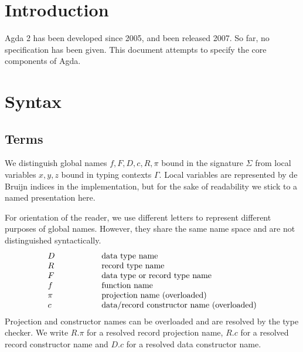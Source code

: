 \documentclass[acmlarge,fleqn]{acmart}\settopmatter{}
\renewcommand{\|}{\mid}
\begin{document}
\section{Introduction}

Agda 2 has been developed since 2005, and been released 2007.  So far,
no specification has been given.  This document attempts to specify
the core components of Agda.


\section{Syntax}
\label{sec:syntax}

\newcommand{\bang}{\,!\,}
\newcommand{\twobang}{\,!!\,}
\newcommand{\dotp}[1]{\lfloor#1\rfloor}

\subsection{Terms}

We distinguish global names $f,F,D,c,R,\pi$ bound in the signature $\Sigma$ from
local variables $x,y,z$ bound in typing contexts $\Gamma$.  Local
variables are represented by de Bruijn indices in the implementation,
but for the sake of readability we stick to a named presentation here.

For orientation of the reader, we use different letters to represent
different purposes of global names.  However, they share the same name
space and are not distinguished syntactically.
\[
\begin{array}{l@{\hspace{2cm}}l}
  D & \text{data type name} \\
  R & \text{record type name} \\
  F & \text{data type or record type name} \\
  f & \text{function name} \\
\pi & \text{projection name  (overloaded)} \\
  c & \text{data/record constructor name (overloaded)} \\
\end{array}
\]
Projection and constructor names can be overloaded and are resolved by
the type checker.  We write $R.\pi$ for a resolved record projection
name, $R.c$ for a resolved record constructor name and $D.c$ for a
resolved data constructor name.
\end{document}
